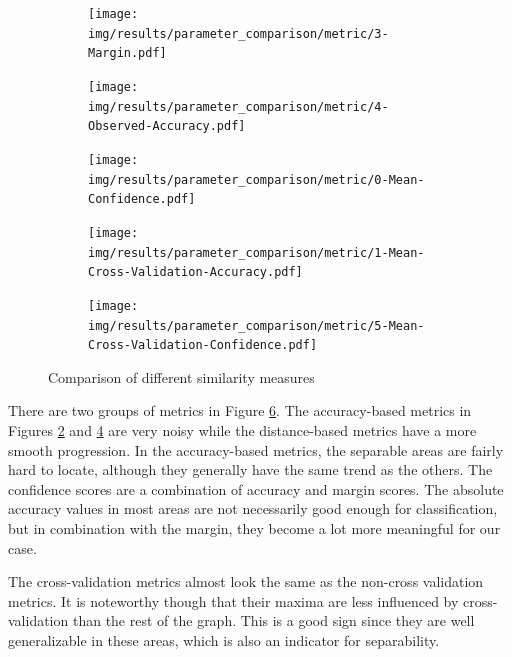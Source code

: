 \documentclass[pdftex,12pt,a4paper]{report}
\begin{document}
\begin{figure}[h]
	\centering
	\begin{subfigure}[b]{0.32\textwidth}
		\centering
		\texttt{[image: img/results/parameter\_comparison/metric/3-Margin.pdf]}
		\label{fig:metrics-0}
	\end{subfigure}
	\begin{subfigure}[b]{0.32\textwidth}
		\centering
		\texttt{[image: img/results/parameter\_comparison/metric/4-Observed-Accuracy.pdf]}
		\label{fig:metrics-1}
	\end{subfigure}
	\begin{subfigure}[b]{0.32\textwidth}
		\centering
		\texttt{[image: img/results/parameter\_comparison/metric/0-Mean-Confidence.pdf]}
		\label{fig:metrics-2}
	\end{subfigure}
	\begin{subfigure}[b]{0.32\textwidth}
		\centering
		\texttt{[image: img/results/parameter\_comparison/metric/1-Mean-Cross-Validation-Accuracy.pdf]}
		\label{fig:metrics-3}
	\end{subfigure}
	\begin{subfigure}[b]{0.32\textwidth}
		\centering
		\texttt{[image: img/results/parameter\_comparison/metric/5-Mean-Cross-Validation-Confidence.pdf]}
		\label{fig:metrics-4}
	\end{subfigure}
	\caption{Comparison of different similarity measures}
	\label{fig:metrics}
\end{figure}

There are two groups of metrics in Figure \ref{fig:metrics}. The accuracy-based metrics in Figures \ref{fig:metrics-1} and \ref{fig:metrics-3} are very noisy while the distance-based metrics have a more smooth progression. In the accuracy-based metrics, the separable areas are fairly hard to locate, although they generally have the same trend as the others. The confidence scores are a combination of accuracy and margin scores. The absolute accuracy values in most areas are not necessarily good enough for classification, but in combination with the margin, they become a lot more meaningful for our case.

The cross-validation metrics almost look the same as the non-cross validation metrics. It is noteworthy though that their maxima are less influenced by cross-validation than the rest of the graph. This is a good sign since they are well generalizable in these areas, which is also an indicator for separability.
\end{document}
